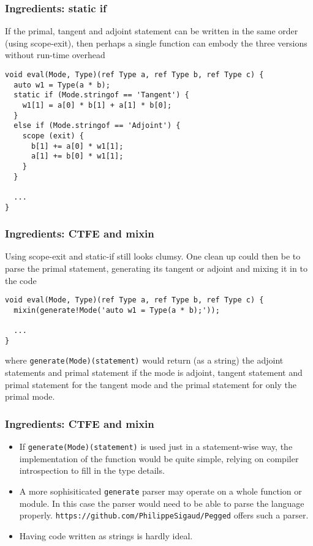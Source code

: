 \documentclass[xcolor=dvipsnames]{beamer}
\begin{document}
\begin{frame}[fragile]
  \frametitle{Ingredients: static if}
If the primal, tangent and adjoint statement can be written in the same order (using scope-exit), then perhaps a single function can embody the three versions without run-time overhead
\vspace{2mm}
  \begin{lstlisting}
void eval(Mode, Type)(ref Type a, ref Type b, ref Type c) {
  auto w1 = Type(a * b);
  static if (Mode.stringof == 'Tangent') {
    w1[1] = a[0] * b[1] + a[1] * b[0];
  }
  else if (Mode.stringof == 'Adjoint') {
    scope (exit) {
      b[1] += a[0] * w1[1];
      a[1] += b[0] * w1[1];
    }
  }

  ...
}
  \end{lstlisting}
\end{frame}


\begin{frame}[fragile]
  \frametitle{Ingredients: CTFE and mixin}
Using scope-exit and static-if still looks clumsy. One clean up could then be to parse the primal statement, generating its tangent or adjoint and mixing it in to the code
\vspace{2mm}
  \begin{lstlisting}
void eval(Mode, Type)(ref Type a, ref Type b, ref Type c) {
  mixin(generate!Mode('auto w1 = Type(a * b);'));

  ...
}
  \end{lstlisting}
\vspace{2mm}
where \texttt{generate(Mode)(statement)} would return (as a string) the adjoint statements and primal statement if the mode is adjoint, tangent statement and primal statement for the tangent mode and the primal statement for only the primal mode.
\end{frame}


\begin{frame}[fragile]
  \frametitle{Ingredients: CTFE and mixin}
\begin{itemize}
\item If \texttt{generate(Mode)(statement)} is used just in a statement-wise way, the implementation of the function would be quite simple, relying on compiler introspection to fill in the type details. \vspace{5mm}
\item A more sophisiticated \texttt{generate} parser may operate on a whole function or module. In this case the parser would need to be able to parse the language properly. \texttt{https://github.com/PhilippeSigaud/Pegged} offers such a parser. \vspace{5mm}
\item Having code written as strings is hardly ideal.
\end{itemize}
\end{frame}
\end{document}
